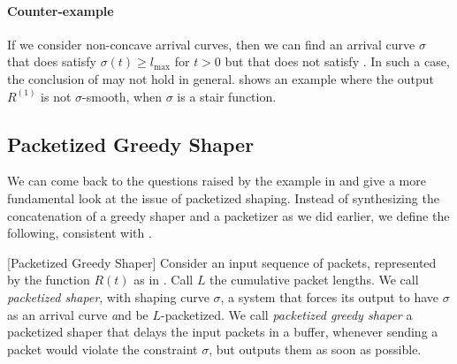 \paragraph{Counter-example}

If we consider non-concave arrival curves, then we can find an
arrival curve $\sigma$ that does satisfy $\sigma(t) \geq l_{\max}$
for $t>0$ but that does not satisfy . In such a
case, the conclusion of  may not hold in general.
 shows an example where the output $R^{(1)}$ is
not $\sigma$-smooth, when $\sigma$ is a stair function.
\begin{figure}[!htbp]
\end{figure}

\subsection{Packetized Greedy Shaper}
 We can come back to the questions raised by the
example in  and give a more fundamental look at the
issue of packetized shaping. Instead of synthesizing the
concatenation of a greedy shaper and a packetizer as we did
earlier, we define the following, consistent with .
\begin{definition}
 [Packetized Greedy Shaper] Consider an
input sequence of packets, represented by the function $R(t)$ as
in . Call $L$ the cumulative packet lengths. We call
\emph{packetized shaper}, with shaping curve $\sigma$, a system
that forces its output to have $\sigma$ as an arrival curve {\emph
and} be $L$-packetized. We call \emph{packetized greedy shaper} a
packetized shaper that delays the input packets in a buffer,
whenever sending a packet would violate the constraint $\sigma$,
but outputs them as soon as possible.
\end{definition}
